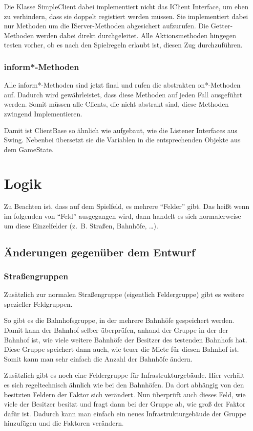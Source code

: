 \documentclass[a4paper,10pt]{article}
\begin{document}
\begin{itemize}
Die Klasse SimpleClient dabei implementiert nicht das IClient Interface, um eben zu verhindern, dass sie doppelt registiert werden müssen. Sie implementiert dabei nur Methoden um die IServer-Methoden abgesichert aufzurufen. Die Getter-Methoden werden dabei direkt durchgeleitet. Alle Aktionsmethoden hingegen testen vorher, ob es nach den Spielregeln erlaubt ist, diesen Zug durchzuführen.
\subsubsection{inform*-Methoden}
Alle inform*-Methoden sind jetzt final und rufen die abstrakten on*-Methoden auf. Dadurch wird gewährleistet, dass diese Methoden auf jeden Fall ausgeführt werden. Somit müssen alle Clients, die nicht abstrakt sind, diese Methoden zwingend Implementieren.

Damit ist ClientBase so ähnlich wie aufgebaut, wie die Listener Interfaces aus Swing. Nebenbei übersetzt sie die Variablen in die entsprechenden Objekte aus dem GameState.
\newpage
\section{Logik}
Zu Beachten ist, dass auf dem Spielfeld, es mehrere ``Felder'' gibt. Das heißt wenn im folgenden von ``Feld'' ausgegangen wird, dann handelt es sich normalerweise um diese Einzelfelder (z.~B. Straßen, Bahnhöfe, \dots).
\subsection {Änderungen gegenüber dem Entwurf}
\subsubsection{Straßengruppen}
Zusätzlich zur normalen Straßengruppe (eigentlich Feldergruppe) gibt es weitere spezieller Feldgruppen.

So gibt es die Bahnhofsgruppe, in der mehrere Bahnhöfe gespeichert werden. Damit kann der Bahnhof selber überprüfen, anhand der Gruppe in der der Bahnhof ist, wie viele weitere Bahnhöfe der Besitzer des testenden Bahnhofs hat. Diese Gruppe speichert dann auch, wie teuer die Miete für diesen Bahnhof ist. Somit kann man sehr einfach die Anzahl der Bahnhöfe ändern.

Zusätzlich gibt es noch eine Feldergruppe für Infrastrukturgebäude. Hier verhält es sich regeltechnisch ähnlich wie bei den Bahnhöfen. Da dort abhängig von den besitzten Feldern der Faktor sich verändert. Nun überprüft auch dieses Feld, wie viele der Besitzer besitzt und fragt dann bei der Gruppe ab, wie groß der Faktor dafür ist. Dadurch kann man einfach ein neues Infrastrukturgebäude der Gruppe hinzufügen und die Faktoren verändern.

\end{itemize}
\end{document}

